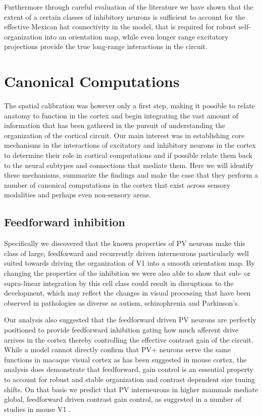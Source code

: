 Furthermore through careful evaluation of the literature we have shown
that the extent of a certain classes of inhibitory neurons is
sufficient to account for the effective Mexican hat connectivity in
the model, that is required for robust self-organization into an
orientation map, while even longer range excitatory projections
provide the true long-range interactions in the circuit.

\section{Canonical Computations}

The spatial calibration was however only a first step, making it
possible to relate anatomy to function in the cortex and begin
integrating the vast amount of information that has been gathered in
the pursuit of understanding the organization of the cortical
circuit. Our main interest was in establishing core mechanisms in the
interactions of excitatory and inhibitory neurons in the cortex to
determine their role in cortical computations and if possible relate
them back to the neural subtypes and connections that mediate
them. Here we will identify these mechanisms, summarize the findings
and make the case that they perform a number of canonical computations
in the cortex that exist across sensory modalities and perhaps even
non-sensory areas.

\subsection{Feedforward inhibition}

Specifically we discovered that the known properties of PV neurons
make this class of large, feedforward and recurrently driven
interneurons particularly well suited towards driving the organization
of V1 into a smooth orientation map. By changing the properties of the
inhibition we were also able to show that sub- or supra-linear
integration by this cell class could result in disruptions to the
development, which may reflect the changes in visual processing that
have been observed in pathologies as diverse as autism, schizophrenia
and Parkinson's.

Our analysis also suggested that the feedforward driven PV neurons are
perfectly positioned to provide feedforward inhibition gating how much
afferent drive arrives in the cortex thereby controlling the effective
contrast gain of the circuit. While a model cannot directly confirm
that PV+ neurons serve the same functions in macaque visual cortex as
has been suggested in mouse cortex, the analysis does demonstrate that
feedforward, gain control is an essential property to account for
robust and stable organization and contrast dependent size tuning
shifts. On that basis we predict that PV interneurons in higher
mammals mediate global, feedforward driven contrast gain control, as
suggested in a number of studies in mouse V1 \citep{Ma2010,
  Atallah2012, Wilson2012, Nienborg2013}.

